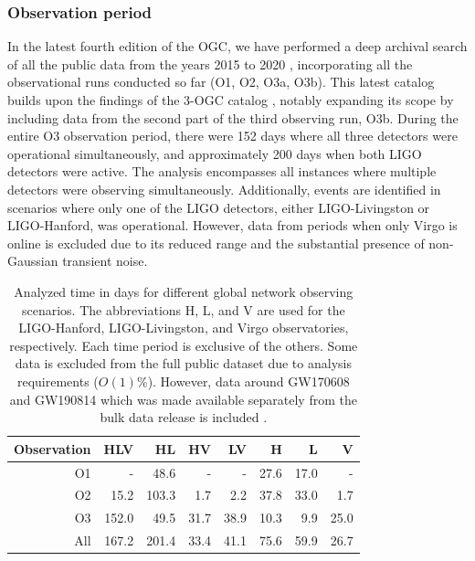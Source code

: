 \subsubsection{Observation period} 
In the latest fourth edition of the OGC, we have performed a deep archival search of all the public data from the years 2015 to 2020 \cite{Nitz:2021zwj}, incorporating all the observational runs conducted so far (O1, O2, O3a, O3b). This latest catalog builds upon the findings of the 3-OGC catalog \cite{Nitz:2021uxj}, notably expanding its scope by including data from the second part of the third observing run, O3b. During the entire O3 observation period, there were 152 days where all three detectors were operational simultaneously, and approximately 200 days when both LIGO detectors were active. The analysis encompasses all instances where multiple detectors were observing simultaneously. Additionally, events are identified in scenarios where only one of the LIGO detectors, either LIGO-Livingston or LIGO-Hanford, was operational. However, data from periods when only Virgo is online is excluded due to its reduced range and the substantial presence of non-Gaussian transient noise.

\begin{table}
  \begin{center}
    \caption{Analyzed time in days for different global network observing scenarios. The abbreviations H, L, and V are used for the LIGO-Hanford, LIGO-Livingston, and Virgo observatories, respectively. Each time period is exclusive of the others. Some data is excluded from the full public dataset due to analysis requirements ($O(1)\%$). However, data around GW170608 and GW190814 which was made available separately from the bulk data release is included \cite{Vallisneri:2014vxa}.}
    \label{table:4ogc-timeline}
\begin{tabular}{rrrrrrrr}
Observation & HLV & HL & HV & LV & H & L & V \\\hline
O1 \vline& - & 48.6 & - & - & 27.6 & 17.0 & - \\
O2 \vline&15.2 & 103.3 & 1.7 & 2.2 & 37.8 & 33.0 & 1.7 \\
O3 \vline&152.0 & 49.5 & 31.7 & 38.9 & 10.3 & 9.9 & 25.0 \\
All \vline&167.2 & 201.4 & 33.4 & 41.1 & 75.6 & 59.9 & 26.7 \\
\end{tabular}
  \end{center}
\end{table}


